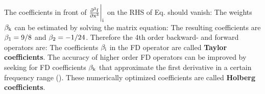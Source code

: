 The coefficients in front of $\rm{\frac{\partial^3 f}{\partial x^3}\biggr|_i}$ on the RHS of Eq.  should vanish:
The weights $\rm{\beta_k}$ can be estimated by solving the matrix equation:
The resulting coefficients are $\rm{\beta_1=9/8}$ and $\rm{\beta_2=-1/24}$. Therefore the 4th order backward- and forward operators are:
The coefficients $\rm{\beta_i}$ in the FD operator are called {\bf{Taylor coefficients}}. 
The accuracy of higher order FD operators can be improved by seeking for FD coefficients $\rm{\beta_k}$ that approximate the first derivative in a certain frequency range (\cite{holberg:87}). These numerically optimized coefficients are called {\bf{Holberg coefficients}}.

